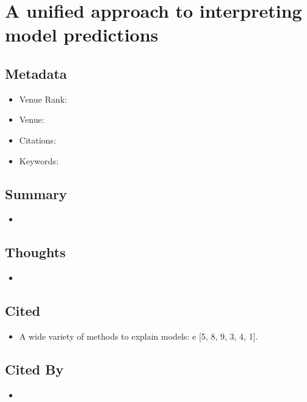 \documentclass{article}
\begin{document}
\pagebreak


\section*{A unified approach to interpreting model predictions}

\subsection*{Metadata}
\begin{itemize}
	\item Venue Rank:
	\item Venue:
	\item Citations: 
	\item Keywords: 
\end{itemize}

\subsection*{Summary}
\begin{itemize}
	\item
\end{itemize}

\subsection*{Thoughts}
\begin{itemize}
	\item
\end{itemize}

\subsection*{Cited}
\begin{itemize}
	\item A wide variety of methods to explain models: e [5, 8, 9, 3, 4, 1].
\end{itemize}

\subsection*{Cited By}
\begin{itemize}
	\item
\end{itemize}
\end{document}
